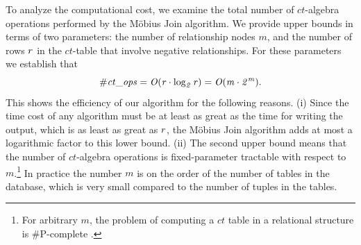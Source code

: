 \documentclass{acm_proc_article-sp}
\newcommand{\ct}{\mathit{ct}}
\begin{document}
%
%


To  analyze the computational cost, we examine the total number of $\ct$-algebra operations performed by the  M\"obius Join algorithm. 
%
We provide  upper bounds in terms of two parameters: the number of relationship nodes  $m$, and  the number of rows $r$  in the $\ct$-table that involve negative relationships.
For these parameters we establish that
$$\it{\# \ct\_\it{ops}} = O(r \cdot \log_{2} r) = O(m \cdot 2^{m}) .$$
This shows the efficiency of our algorithm for the following reasons.
(i) Since the time cost of any algorithm must be at least as great as the time for writing the output, which is as least as great as $r$, 
 the  M\"obius Join algorithm adds at most a logarithmic factor to this lower bound. 
(ii)  The second upper bound means that the number of $\ct$-algebra operations is fixed-parameter tractable with respect to $m$.\footnote{For arbitrary $m$, the problem of computing a $\ct$ table in a relational structure is \#P-complete \cite[Prop.12.4]{Domingos2007}.} In practice the number $m$ is on the order of the number of tables in the database, 
which is very small compared to the number of tuples in the tables.
\end{document}
